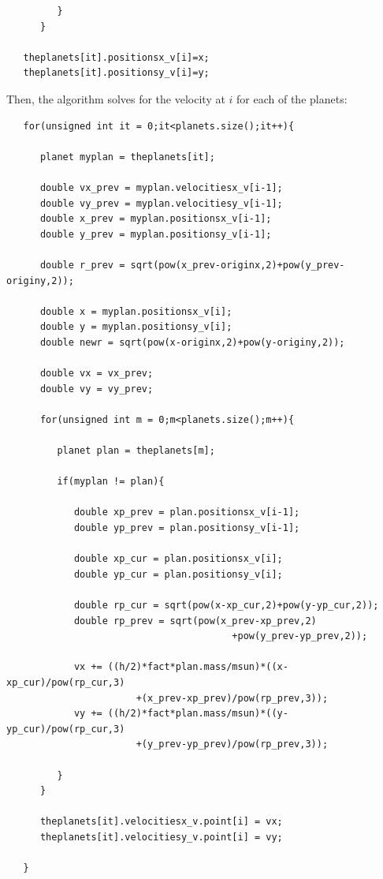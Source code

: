 \documentclass[12pt]{article}
\numberwithin{equation}{section}
\begin{document}
\begin{itemize}
\begin{verbatim}
         }
      }

   theplanets[it].positionsx_v[i]=x;
   theplanets[it].positionsy_v[i]=y;
\end{verbatim}

Then, the algorithm solves for the velocity at $i$ for each of the planets:

\begin{verbatim}
   for(unsigned int it = 0;it<planets.size();it++){
      
      planet myplan = theplanets[it];
      
      double vx_prev = myplan.velocitiesx_v[i-1];
      double vy_prev = myplan.velocitiesy_v[i-1];
      double x_prev = myplan.positionsx_v[i-1];
      double y_prev = myplan.positionsy_v[i-1];
      
      double r_prev = sqrt(pow(x_prev-originx,2)+pow(y_prev-originy,2));
      
      double x = myplan.positionsx_v[i];
      double y = myplan.positionsy_v[i];
      double newr = sqrt(pow(x-originx,2)+pow(y-originy,2));
    
      double vx = vx_prev;
      double vy = vy_prev;
      
      for(unsigned int m = 0;m<planets.size();m++){
	
         planet plan = theplanets[m];
	
         if(myplan != plan){
	  
            double xp_prev = plan.positionsx_v[i-1];
            double yp_prev = plan.positionsy_v[i-1];
	  
            double xp_cur = plan.positionsx_v[i];
            double yp_cur = plan.positionsy_v[i];
	  
            double rp_cur = sqrt(pow(x-xp_cur,2)+pow(y-yp_cur,2));
            double rp_prev = sqrt(pow(x_prev-xp_prev,2)
                                        +pow(y_prev-yp_prev,2));
	  
            vx += ((h/2)*fact*plan.mass/msun)*((x-xp_cur)/pow(rp_cur,3)
                       +(x_prev-xp_prev)/pow(rp_prev,3));
            vy += ((h/2)*fact*plan.mass/msun)*((y-yp_cur)/pow(rp_cur,3)
                       +(y_prev-yp_prev)/pow(rp_prev,3));
	  
         }
      }
      
      theplanets[it].velocitiesx_v.point[i] = vx;
      theplanets[it].velocitiesy_v.point[i] = vy;
    
   }
\end{verbatim}


\end{itemize}
\end{document}
